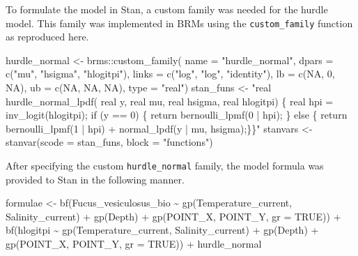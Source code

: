 \documentclass[
  12pt,
  oneside]{book}
\newenvironment{Shaded}{\begin{snugshade}}{\end{snugshade}}
\newcommand{\AttributeTok}[1]{\textcolor[rgb]{0.77,0.63,0.00}{#1}}
\newcommand{\ConstantTok}[1]{\textcolor[rgb]{0.00,0.00,0.00}{#1}}
\newcommand{\DecValTok}[1]{\textcolor[rgb]{0.00,0.00,0.81}{#1}}
\newcommand{\FunctionTok}[1]{\textcolor[rgb]{0.00,0.00,0.00}{#1}}
\newcommand{\NormalTok}[1]{#1}
\newcommand{\OtherTok}[1]{\textcolor[rgb]{0.56,0.35,0.01}{#1}}
\newcommand{\SpecialCharTok}[1]{\textcolor[rgb]{0.00,0.00,0.00}{#1}}
\newcommand{\StringTok}[1]{\textcolor[rgb]{0.31,0.60,0.02}{#1}}
\theoremstyle{definition}
\theoremstyle{definition}
\theoremstyle{definition}
\theoremstyle{remark}
\begin{document}
To formulate the model in Stan, a custom family was needed for the hurdle model.
This family was implemented in BRMs using the \texttt{custom\_family} function as reproduced here.

\begin{Shaded}
\begin{Highlighting}[]
\NormalTok{hurdle\_normal }\OtherTok{\textless{}{-}}\NormalTok{ brms}\SpecialCharTok{::}\FunctionTok{custom\_family}\NormalTok{(}
  \AttributeTok{name =} \StringTok{"hurdle\_normal"}\NormalTok{, }
  \AttributeTok{dpars =} \FunctionTok{c}\NormalTok{(}\StringTok{"mu"}\NormalTok{, }\StringTok{"hsigma"}\NormalTok{, }\StringTok{"hlogitpi"}\NormalTok{),}
  \AttributeTok{links =} \FunctionTok{c}\NormalTok{(}\StringTok{"log"}\NormalTok{, }\StringTok{"log"}\NormalTok{, }\StringTok{"identity"}\NormalTok{), }
  \AttributeTok{lb =} \FunctionTok{c}\NormalTok{(}\ConstantTok{NA}\NormalTok{, }\DecValTok{0}\NormalTok{, }\ConstantTok{NA}\NormalTok{),}
  \AttributeTok{ub =} \FunctionTok{c}\NormalTok{(}\ConstantTok{NA}\NormalTok{, }\ConstantTok{NA}\NormalTok{, }\ConstantTok{NA}\NormalTok{),}
  \AttributeTok{type =} \StringTok{"real"}\NormalTok{)}
\NormalTok{stan\_funs }\OtherTok{\textless{}{-}} \StringTok{"real hurdle\_normal\_lpdf(}
\StringTok{                real y, real mu, real hsigma, real hlogitpi) \{ }
\StringTok{    real hpi = inv\_logit(hlogitpi);}
\StringTok{    if (y == 0) \{}
\StringTok{      return bernoulli\_lpmf(0 | hpi); }
\StringTok{    \} else \{ }
\StringTok{      return bernoulli\_lpmf(1 | hpi) +  }
\StringTok{        normal\_lpdf(y | mu, hsigma);\}\}"}
\NormalTok{stanvars }\OtherTok{\textless{}{-}} \FunctionTok{stanvar}\NormalTok{(}\AttributeTok{scode =}\NormalTok{ stan\_funs, }\AttributeTok{block =} \StringTok{"functions"}\NormalTok{)}
\end{Highlighting}
\end{Shaded}

After specifying the custom \texttt{hurdle\_normal} family, the model formula was provided to Stan in the following manner.

\begin{Shaded}
\begin{Highlighting}[]
\NormalTok{formulae }\OtherTok{\textless{}{-}} 
  \FunctionTok{bf}\NormalTok{(Fucus\_vesiculosus\_bio }\SpecialCharTok{\textasciitilde{}} \FunctionTok{gp}\NormalTok{(Temperature\_current, Salinity\_current) }\SpecialCharTok{+} 
    \FunctionTok{gp}\NormalTok{(Depth) }\SpecialCharTok{+} \FunctionTok{gp}\NormalTok{(POINT\_X, POINT\_Y, }\AttributeTok{gr =} \ConstantTok{TRUE}\NormalTok{)) }\SpecialCharTok{+}
  \FunctionTok{bf}\NormalTok{(hlogitpi }\SpecialCharTok{\textasciitilde{}} \FunctionTok{gp}\NormalTok{(Temperature\_current, Salinity\_current) }\SpecialCharTok{+} \FunctionTok{gp}\NormalTok{(Depth) }\SpecialCharTok{+} 
    \FunctionTok{gp}\NormalTok{(POINT\_X, POINT\_Y, }\AttributeTok{gr =} \ConstantTok{TRUE}\NormalTok{)) }\SpecialCharTok{+}
\NormalTok{  hurdle\_normal}
\end{Highlighting}
\end{Shaded}
\end{document}
